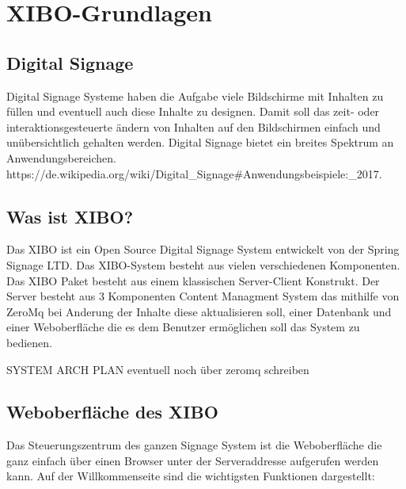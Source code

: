 \chapter{XIBO-Grundlagen}
\section{Digital Signage}\label{sec:digitalsignage}
Digital Signage Systeme haben die Aufgabe viele Bildschirme mit Inhalten zu füllen und eventuell auch diese Inhalte zu designen. Damit soll das zeit- oder interaktionsgesteuerte ändern von Inhalten auf den Bildschirmen einfach und unübersichtlich gehalten werden. Digital Signage bietet ein breites Spektrum an Anwendungsbereichen.    https://de.wikipedia.org/wiki/Digital_Signage#Anwendungsbeispiele:_2017.

\section{Was ist XIBO?}\label{sec:xibo}
Das XIBO ist ein Open Source Digital Signage System entwickelt von der Spring Signage LTD. Das XIBO-System besteht aus vielen verschiedenen Komponenten. Das XIBO Paket besteht aus einem klassischen Server-Client Konstrukt. Der Server besteht aus 3 Komponenten Content Managment System das mithilfe von ZeroMq bei Anderung der Inhalte diese aktualisieren soll, einer Datenbank und einer Weboberfläche die es dem Benutzer ermöglichen soll das System zu bedienen.

SYSTEM ARCH PLAN eventuell noch über zeromq schreiben

\section{Weboberfläche des XIBO}\label{sec:webpagexibo}
Das Steuerungszentrum des ganzen Signage System ist die Weboberfläche die ganz einfach über einen Browser unter der Serveraddresse aufgerufen werden kann. Auf der Willkommenseite sind die wichtigsten Funktionen dargestellt:

